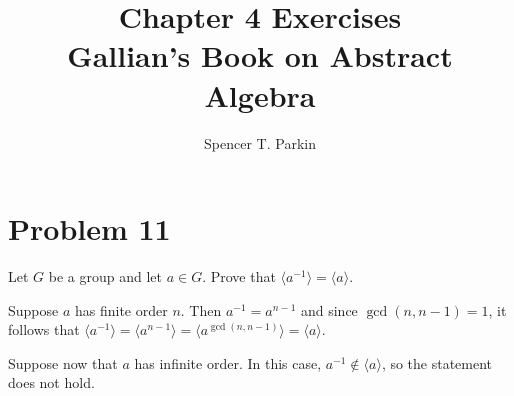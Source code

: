 \documentclass[12pt]{article}
\title{Chapter 4 Exercises\\Gallian's Book on Abstract Algebra}
\author{Spencer T. Parkin}
\begin{document}
\maketitle

\section*{Problem 11}

Let $G$ be a group and let $a\in G$.  Prove that $\langle a^{-1}\rangle=\langle a\rangle$.

Suppose $a$ has finite order $n$.  Then $a^{-1}=a^{n-1}$ and
since $\gcd(n,n-1)=1$, it follows that $\langle a^{-1}\rangle=
\langle a^{n-1}\rangle=\langle a^{\gcd(n,n-1)}\rangle=\langle a\rangle$.

Suppose now that $a$ has infinite order.  In this case, $a^{-1}\not\in\langle a\rangle$,
so the statement does not hold.
\end{document}
